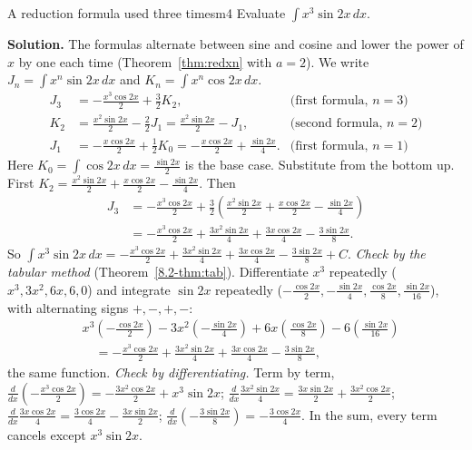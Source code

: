 \documentclass[11pt]{article}
\begin{document}
\begin{exmp}{A reduction formula used three times}{m4}
Evaluate $\displaystyle\int x^3\sin2x\,dx$.

\textbf{Solution.} The formulas alternate between sine and cosine and lower the power of $x$ by one each time (Theorem~\ref{thm:redxn} with $a=2$). We write $J_n=\int x^n\sin2x\,dx$ and $K_n=\int x^n\cos2x\,dx$.
\begin{align*}
J_3&=-\frac{x^3\cos2x}2+\frac32K_2, &\text{(first formula, $n=3$)}\\
K_2&=\frac{x^2\sin2x}2-\frac22J_1=\frac{x^2\sin2x}2-J_1, &\text{(second formula, $n=2$)}\\
J_1&=-\frac{x\cos2x}2+\frac12K_0=-\frac{x\cos2x}2+\frac{\sin2x}4. &\text{(first formula, $n=1$)}
\end{align*}
Here $K_0=\int\cos2x\,dx=\frac{\sin2x}2$ is the base case. Substitute from the bottom up. First $K_2=\frac{x^2\sin2x}2+\frac{x\cos2x}2-\frac{\sin2x}4$. Then
\begin{align*}J_3&=-\frac{x^3\cos2x}2+\frac32\left(\frac{x^2\sin2x}2+\frac{x\cos2x}2-\frac{\sin2x}4\right)\\&=-\frac{x^3\cos2x}2+\frac{3x^2\sin2x}4+\frac{3x\cos2x}4-\frac{3\sin2x}8 .\end{align*}
So $\displaystyle\int x^3\sin2x\,dx=-\frac{x^3\cos2x}2+\frac{3x^2\sin2x}4+\frac{3x\cos2x}4-\frac{3\sin2x}8+C$.
\emph{Check by the tabular method} (Theorem~\ref{8.2-thm:tab}). Differentiate $x^3$ repeatedly ($x^3,3x^2,6x,6,0$) and integrate $\sin2x$ repeatedly ($-\frac{\cos2x}2,-\frac{\sin2x}4,\frac{\cos2x}8,\frac{\sin2x}{16}$), with alternating signs $+,-,+,-$:
\begin{align*}&x^3\left(-\frac{\cos2x}2\right)-3x^2\left(-\frac{\sin2x}4\right)+6x\left(\frac{\cos2x}8\right)-6\left(\frac{\sin2x}{16}\right)\\&\quad=-\frac{x^3\cos2x}2+\frac{3x^2\sin2x}4+\frac{3x\cos2x}4-\frac{3\sin2x}8,\end{align*}
the same function. \emph{Check by differentiating.} Term by term, $\frac d{dx}\left(-\frac{x^3\cos2x}2\right)=-\frac{3x^2\cos2x}2+x^3\sin2x$; $\frac d{dx}\frac{3x^2\sin2x}4=\frac{3x\sin2x}2+\frac{3x^2\cos2x}2$; $\frac d{dx}\frac{3x\cos2x}4=\frac{3\cos2x}4-\frac{3x\sin2x}2$; $\frac d{dx}\left(-\frac{3\sin2x}8\right)=-\frac{3\cos2x}4$. In the sum, every term cancels except $x^3\sin2x$.
\end{exmp}
\end{document}
